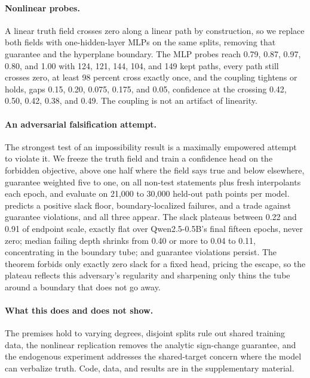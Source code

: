 \documentclass[mlmain,onecolumn]{jmlr}
\begin{document}
\paragraph{Nonlinear probes.}
A linear truth field crosses zero along a linear path by
construction, so we replace both fields with one-hidden-layer MLPs
on the same splits, removing that guarantee and the hyperplane
boundary. The MLP probes reach 0.79, 0.87, 0.97, 0.80, and 1.00
with 124, 121, 144, 104, and 149 kept paths, every path still
crosses zero, at least 98 percent cross exactly once, and the
coupling tightens or holds, gaps 0.15, 0.20, 0.075, 0.175, and
0.05, confidence at the crossing 0.42, 0.50, 0.42, 0.38, and 0.49.
The coupling is not an artifact of linearity.

\paragraph{An adversarial falsification attempt.}
The strongest test of an impossibility result is a maximally
empowered attempt to violate it. We freeze the truth field and
train a confidence head on the forbidden objective, above one half
where the field says true and below elsewhere, guarantee weighted
five to one, on all non-test statements plus fresh interpolants
each epoch, and evaluate on 21{,}000 to 30{,}000 held-out path
points per model.  predicts a positive slack floor,
boundary-localized failures, and a trade against guarantee
violations, and all three appear. The slack plateaus between 0.22
and 0.91 of endpoint scale, exactly flat over Qwen2.5-0.5B's final
fifteen epochs, never zero; median failing depth shrinks from 0.40
or more to 0.04 to 0.11, concentrating in the boundary tube; and
guarantee violations persist. The theorem forbids only exactly zero
slack for a fixed head,  pricing the escape,
so the plateau reflects this adversary's regularity and sharpening
only thins the tube around a boundary that does not go away.

\paragraph{What this does and does not show.}
The premises hold to varying degrees, disjoint splits rule out
shared training data, the nonlinear replication removes the
analytic sign-change guarantee, and the endogenous experiment
addresses the shared-target concern where the model can verbalize
truth. Code, data, and results are in the supplementary material.
\end{document}
